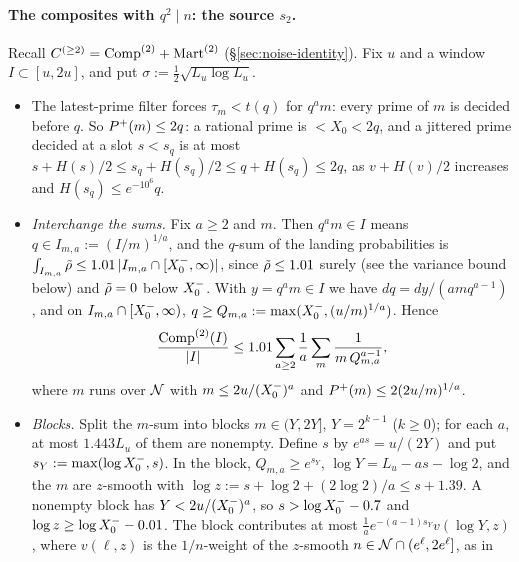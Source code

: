 \paragraph{The composites with $q^2\mid n$: the source $s_2$.} Recall $C^{(\ge2)}=\mathrm{Comp}^{(2)}+\mathrm{Mart}^{(2)}$
(\S\ref{sec:noise-identity}). Fix $u$ and a window $I\subset[u,2u]$, and put $\sigma:=\frac12\sqrt{L_u\log L_u}$.
\begin{itemize}
\item The latest-prime filter forces $\tau_m<t(q)$ for $q^am$: every prime of $m$ is decided before $q$. So $P^{+}(m)\le2q$:
  a rational prime is $<X_0<2q$, and a jittered prime decided at a slot $s<s_q$ is at most
  $s+H(s)/2\le s_q+H(s_q)/2\le q+H(s_q)\le2q$, as $v+H(v)/2$ increases and $H(s_q)\le e^{-10^6}q$.
\item \emph{Interchange the sums.} Fix $a\ge2$ and $m$. Then $q^am\in I$ means $q\in I_{m,a}:=(I/m)^{1/a}$, and the $q$-sum of
  the landing probabilities is $\int_{I_{m,a}}\tilde\rho\le1.01\,|I_{m,a}\cap[X_0^{-},\infty)|$, since $\tilde\rho\le1.01$ surely (see the
  variance bound below) and $\tilde\rho=0$ below $X_0^{-}$. With $y=q^am\in I$ we have $dq=dy/(amq^{a-1})$, and on
  $I_{m,a}\cap[X_0^{-},\infty)$, $q\ge Q_{m,a}:=\max(X_0^{-},(u/m)^{1/a})$. Hence
  \[
    \frac{\mathrm{Comp}^{(2)}(I)}{|I|}\le1.01\sum_{a\ge2}\frac1a\sum_m\frac1{m\,Q_{m,a}^{a-1}},
  \]
  where $m$ runs over $\mathcal{N}$ with $m\le2u/(X_0^{-})^a$ and $P^{+}(m)\le2(2u/m)^{1/a}$.
\item \emph{Blocks.} Split the $m$-sum into blocks $m\in(Y,2Y]$, $Y=2^{k-1}$ ($k\ge0$); for each $a$, at most $1.443L_u$ of
  them are nonempty. Define $s$ by $e^{as}=u/(2Y)$ and put $s_Y:=\max(\log X_0^{-},s)$. In the block, $Q_{m,a}\ge e^{s_Y}$,
  $\log Y=L_u-as-\log2$, and the $m$ are $z$-smooth with $\log z:=s+\log2+(2\log2)/a\le s+1.39$. A nonempty block has
  $Y<2u/(X_0^{-})^a$, so $s>\log X_0^{-}-0.7$ and $\log z\ge\log X_0^{-}-0.01$. The block contributes at most
  $\frac1ae^{-(a-1)s_Y}v(\log Y,z)$, where $v(\ell,z)$ is the $1/n$-weight of the $z$-smooth $n\in\mathcal{N}\cap(e^\ell,2e^\ell]$, as in

\end{itemize}
